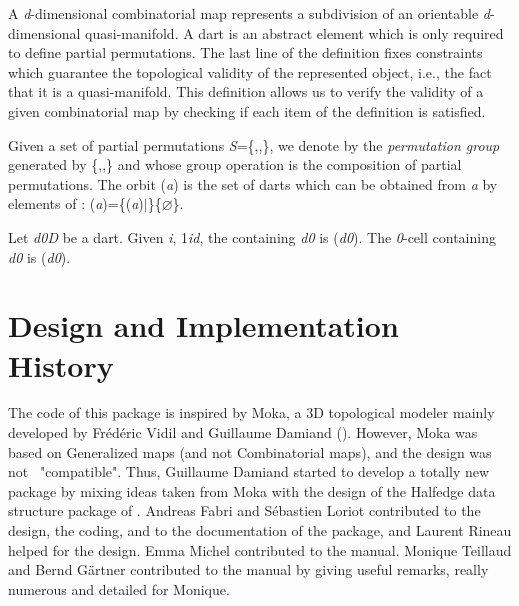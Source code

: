 A \emph{d}-dimensional combinatorial map represents a subdivision of an
orientable \emph{d}-dimensional quasi-manifold. A dart is an abstract element
which is only required to define partial permutations. The last line of
the definition fixes constraints which guarantee the topological
validity of the represented object, i.e., the fact that it is a
quasi-manifold. This definition allows us to verify the validity of a
given combinatorial map by checking if each item of the definition is
satisfied.

Given a set of partial permutations 
\emph{S}=\{,\myldots{},\}, 
we denote by  the \emph{permutation group} generated by
\{,\myldots{},\} 
and whose group operation is the composition of partial permutations.  
The orbit (\emph{a}) 
is the set of darts which can be obtained from \emph{a} by elements of :
(\emph{a})=\{\myphi{}(\emph{a})$|$\myphi{}\myin{}\}\mysetminus{}\{$\varnothing$\}.

Let \emph{d0}\myin{}\emph{D} be a dart. Given \emph{i}, 1\myleq{}\emph{i}\myleq{}\emph{d},
the  containing \emph{d0} is 
\orbit{\betaun{},\myldots{},\betaimun{},\betaipun{},\myldots{},\betad{}}(\emph{d0}).
The \emph{0}-cell  containing \emph{d0} is 
(\emph{d0}).

\section{Design and Implementation History}

The code of this package is inspired by Moka, a 3D topological modeler
mainly developed by Fr\'ed\'eric Vidil and Guillaume Damiand
().
However, Moka was based on Generalized maps (and not Combinatorial
maps), and the design was not \cgal\ "compatible". Thus, Guillaume
Damiand started to develop a totally new package by mixing ideas taken
from Moka with the design of the Halfedge data structure package of
\cgal.  Andreas Fabri and S\'ebastien Loriot contributed to the
design, the coding, and to the documentation of the package, and
Laurent Rineau helped for the design. Emma Michel contributed to the
manual. Monique Teillaud and Bernd G{\"a}rtner contributed to the manual
by giving useful remarks, really numerous and detailed for Monique.
